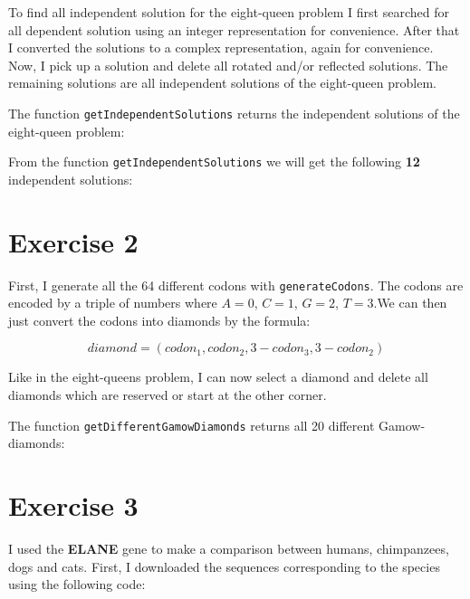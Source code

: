 \documentclass[%
]
{scrartcl}
\theoremstyle{plain}
\begin{document}
To find all independent solution for the eight-queen problem I first searched for all dependent solution using an integer representation for convenience. After that I converted the solutions to a complex representation, again for convenience. Now, I pick up a solution and delete all rotated and/or reflected solutions. The remaining solutions are all independent solutions of the eight-queen problem.

The function \texttt{getIndependentSolutions} returns the independent solutions of the eight-queen problem:



From the function \texttt{getIndependentSolutions} we will get the following \textbf{12} independent solutions:



\section*{Exercise 2}

First, I generate all the 64 different codons with \texttt{generateCodons}. The codons are encoded by a triple of numbers where $A=0$, $C=1$, $G=2$, $T=3$.We can then just convert the codons into diamonds by the formula:

\begin{equation*}
diamond = (codon_{1}, codon_{2}, 3-codon_{3}, 3-codon_{2})
\end{equation*}

Like in the eight-queens problem, I can now select a diamond and delete all diamonds which are reserved or start at the other corner.



The function \texttt{getDifferentGamowDiamonds} returns all 20 different Gamow-diamonds:



\section*{Exercise 3}

I used the \textbf{ELANE} gene to make a comparison between humans, chimpanzees, dogs and cats. First, I downloaded the sequences corresponding to the species using the following code:


\end{document}
